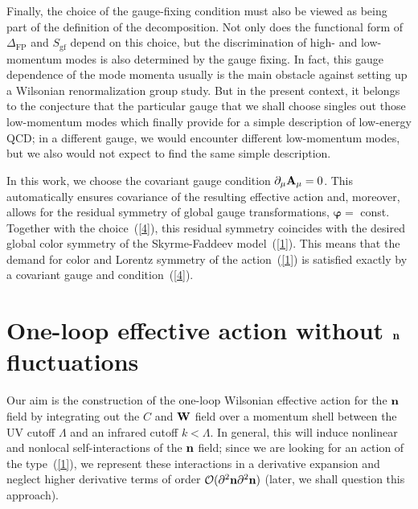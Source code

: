 \documentclass[a4paper,12pt]{article}
\newcommand{\re}[1]{~(\ref{#1})}
\begin{document}
Finally, the choice of the gauge-fixing condition must also be viewed
as being part of the definition of the decomposition. Not only does
the functional form of $\Delta_{\text{FP}}$ and $S_{\text{gf}}$
depend on this choice, but the discrimination of high- and
low-momentum modes is also determined by the gauge fixing. In fact,
this gauge dependence of the mode momenta usually is the main obstacle
against setting up a Wilsonian renormalization group study. But in the
present context, it belongs to the conjecture that the particular
gauge that we shall choose singles out those low-momentum modes which
finally provide for a simple description of low-energy QCD; in a
different gauge, we would encounter different low-momentum modes, but
we also would not expect to find the same simple description. 

In this work, we choose the covariant gauge condition $\partial_\mu
\mathbf{A}_\mu=0$. This automatically ensures covariance of the resulting
effective action and, moreover, allows for the residual symmetry of
global gauge transformations, $\boldsymbol{\varphi}=\,\,$const.
Together with the choice\re{4}, this residual symmetry coincides with
the desired global color symmetry of the Skyrme-Faddeev model\re{1}.
This means that the demand for color and Lorentz symmetry of the
action\re{1} is satisfied exactly by a covariant gauge and
condition\re{4}.

\section{One-loop effective action without $\mathbf{n}$ fluctuations}
\label{without}

Our aim is the construction of the one-loop Wilsonian effective action
for the $\mathbf{n}$ field by integrating out the $C$ and $\mathbf{W}$ field over a
momentum shell between the UV cutoff $\Lambda$ and an infrared cutoff
$k<\Lambda$. In general, this will induce nonlinear and nonlocal
self-interactions of the $\mathbf{n}$ field; since we are looking for an
action of the type\re{1}, we represent these interactions in a
derivative expansion and neglect higher derivative terms of order
${\cal O}(\partial^2 \mathbf{n} \partial^2 \mathbf{n})$ (later, we shall question
this approach).
\end{document}
